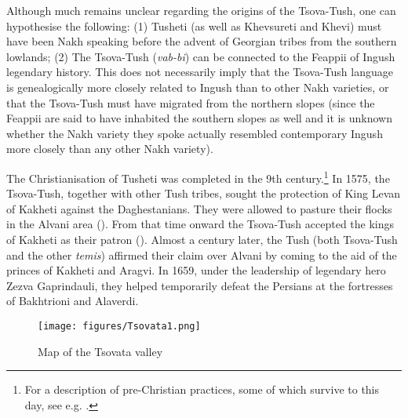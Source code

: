 Although much remains unclear regarding the origins of the Tsova-Tush, one can hypothesise the following: (1) Tusheti (as well as Khevsureti and Khevi) must have been Nakh speaking before the advent of Georgian tribes from the southern lowlands; (2) The Tsova-Tush (\textit{vab-bi}) can be connected to the Feappii of Ingush legendary history. This does not necessarily imply that the Tsova-Tush language is genealogically more closely related to Ingush than to other Nakh varieties, or that the Tsova-Tush must have migrated from the northern slopes (since the Feappii are said to have inhabited the southern slopes as well and it is unknown whether the Nakh variety they spoke actually resembled contemporary Ingush more closely than any other Nakh variety).

The Christianisation of Tusheti was completed in the 9th century.\footnote{For a description of pre-Christian practices, some of which survive to this day, see e.g. 
	\textcite{charachidze19688paienne,tuite2004lightning}.} In 1575, the Tsova-Tush, together with other Tush tribes, sought the protection of King Levan of Kakheti against the Daghestanians. They were allowed to pasture their flocks in the Alvani area (\cites[288--289]{allen1970history}). From that time onward the Tsova-Tush accepted the kings of Kakheti as their patron (\cites[]{desheriev53}). Almost a century later, the Tush (both Tsova-Tush and the other \textit{temis}) affirmed their claim over Alvani by coming to the aid of the princes of Kakheti and Aragvi. In 1659, under the leadership of legendary hero Zezva Gaprindauli, they helped temporarily defeat the Persians at the fortresses of Bakhtrioni and Alaverdi.

\begin{figure}
	\texttt{[image: figures/Tsovata1.png]}
	\caption{Map of the Tsovata valley}
	\label{map-tsovata}
\end{figure}

